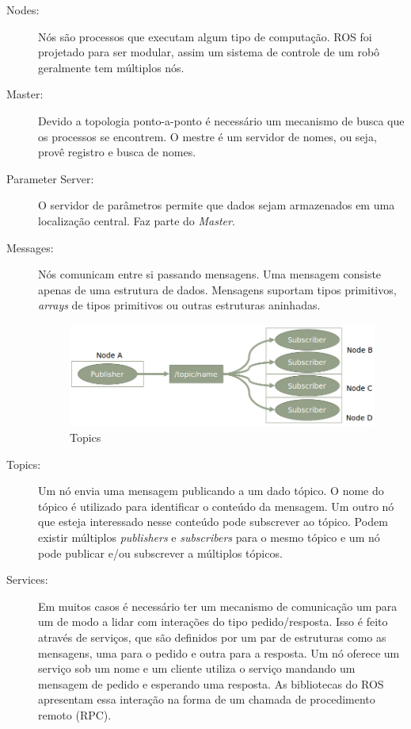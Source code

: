 \begin{description}
\item[Nodes:] Nós são processos que executam algum tipo de computação. ROS foi projetado para ser modular, assim um sistema de controle de um robô geralmente tem múltiplos nós. 

\item[Master:] Devido a topologia ponto-a-ponto é necessário um mecanismo de busca que os processos se encontrem. O mestre é um servidor de nomes, ou seja, provê registro e busca de nomes.

\item[Parameter Server:] O servidor de parâmetros permite que dados sejam armazenados em uma localização central. Faz parte do \textit{Master}.

\item[Messages:] Nós comunicam entre si passando mensagens. Uma mensagem consiste apenas de uma estrutura de dados. Mensagens suportam tipos primitivos, \textit{arrays} de tipos primitivos ou outras estruturas aninhadas. 

\begin{figure}[!h]
  \centering
  \includegraphics[width=0.9\linewidth]{./img/topics.png}
  \caption{Topics}
  \label{fig:topics}
\end{figure}

\item[Topics:] Um nó envia uma mensagem publicando a um dado tópico. O nome do tópico é utilizado para identificar o conteúdo da mensagem. Um outro nó que esteja interessado nesse conteúdo pode subscrever ao tópico. Podem existir múltiplos \textit{publishers} e \textit{subscribers} para o mesmo tópico e um nó pode publicar e/ou subscrever a múltiplos tópicos. 

\item[Services:] Em muitos casos é necessário ter um mecanismo de comunicação um para um de modo a lidar com interações do tipo pedido/resposta. Isso é feito através de serviços, que são definidos por um par de estruturas como as mensagens, uma para o pedido e outra para a resposta. Um nó oferece um serviço sob um nome e um cliente utiliza o serviço mandando um mensagem de pedido e esperando uma resposta. As bibliotecas do ROS apresentam essa interação na forma de um chamada de procedimento remoto (RPC).


\end{description}
